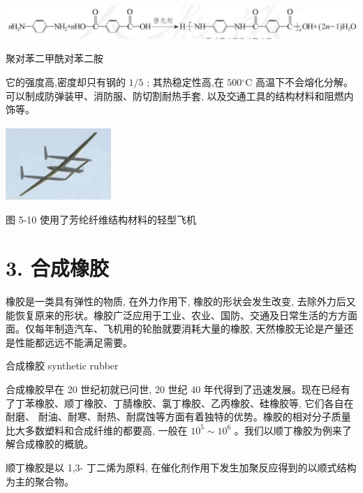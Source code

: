 \documentclass[10pt]{article}
\begin{document}
\begin{center}
\includegraphics[max width=1.0\textwidth]{images/0190efc5-b58a-7c43-bfb0-e0a030df9cfd_148_142192.jpg}
\end{center}

聚对苯二甲酰对苯二胺

它的强度高,密度却只有钢的 \(1/5\) ; 其热稳定性高,在 \({500}{}^{ \circ }\mathrm{C}\) 高温下不会熔化分解。可以制成防弹装甲、消防服、防切割耐热手套, 以及交通工具的结构材料和阻燃内饰等。

\begin{center}
\includegraphics[max width=0.3\textwidth]{images/0190efc5-b58a-7c43-bfb0-e0a030df9cfd_148_741354.jpg}
\end{center}

图 5-10 使用了芳纶纤维结构材料的轻型飞机

\section*{3. 合成橡胶}

橡胶是一类具有弹性的物质, 在外力作用下, 橡胶的形状会发生改变, 去除外力后又能恢复原来的形状。橡胶广泛应用于工业、农业、国防、交通及日常生活的方方面面。仅每年制造汽车、飞机用的轮胎就要消耗大量的橡胶, 天然橡胶无论是产量还是性能都远远不能满足需要。

\begin{mdframed}

合成橡胶 synthetic rubber

\end{mdframed}

合成橡胶早在 20 世纪初就已问世, 20 世纪 40 年代得到了迅速发展。现在已经有了丁苯橡胶、顺丁橡胶、丁腈橡胶、氯丁橡胶、乙丙橡胶、硅橡胶等, 它们各自在耐磨、 耐油、耐寒、耐热、耐腐蚀等方面有着独特的优势。橡胶的相对分子质量比大多数塑料和合成纤维的都要高, 一般在 \({10}^{5} \sim {10}^{6}\) 。我们以顺丁橡胶为例来了解合成橡胶的概貌。

顺丁橡胶是以 1,3- 丁二烯为原料, 在催化剂作用下发生加聚反应得到的以顺式结构为主的聚合物。
\end{document}
